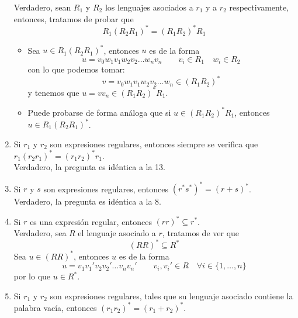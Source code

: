 \begin{enumerate}
        Verdadero, sean $R_1$ y $R_2$ los lenguajes asociados a $r_1$ y a $r_2$ respectivamente, entonces, tratamos de probar que
        \begin{equation*}
            R_1{(R_2R_1)}^{\ast} = {(R_1R_2)}^{\ast}R_1
        \end{equation*}
        \begin{itemize}
            \item Sea $u\in R_1{(R_2R_1)}^{\ast}$, entonces $u$ es de la forma
                \begin{equation*}
                    u = v_0w_1v_1w_2v_2 \ldots w_n v_n \qquad v_i \in R_1 \quad w_i \in R_2
                \end{equation*}
                con lo que podemos tomar:
                \begin{equation*}
                    v = v_0w_1v_1w_2v_2 \ldots w_n \in {(R_1R_2)}^{\ast}
                \end{equation*}
                y tenemos que $u = vv_n \in {(R_1R_2)}^{\ast}R_1$.
            \item Puede probarse de forma análoga que si $u\in {(R_1R_2)}^{\ast}R_1$, entonces $u\in R_1{(R_2R_1)}^{\ast}$.
        \end{itemize}
    \item Si $r_1$ y $r_2$ son expresiones regulares, entonces siempre se verifica que $r_1{(r_2r_1)}^{\ast}={(r_1r_2)}^{\ast}r_1$.\\

        Verdadero, la pregunta es idéntica a la 13.
    \item Si $r$ y $s$ son expresiones regulares, entonces ${(r^\ast s^\ast)}^{\ast}={(r+s)}^{\ast}$.\\

        Verdadero, la pregunta es idéntica a la 8.
    \item Si $r$ es una expresión regular, entonces ${(rr)}^{\ast}\subseteq r^\ast$.\\

        Verdadero, sea $R$ el lenguaje asociado a $r$, tratamos de ver que 
        \begin{equation*}
            {(RR)}^{\ast} \subseteq  R^\ast
        \end{equation*}
        Sea $u\in {(RR)}^{\ast}$, entonces $u$ es de la forma
        \begin{equation*}
            u = v_1v_1'v_2v_2'\ldots v_nv_n' \qquad v_i, v_i' \in R \quad \forall i \in \{1,\ldots, n\}
        \end{equation*}
        por lo que $u\in R^\ast$.
    \item Si $r_1$ y $r_2$ son expresiones regulares, tales que su lenguaje asociado contiene la palabra vacía, entonces ${(r_1r_2)}^{\ast}={(r_1+r_2)}^{\ast}$.\\


\end{enumerate}
